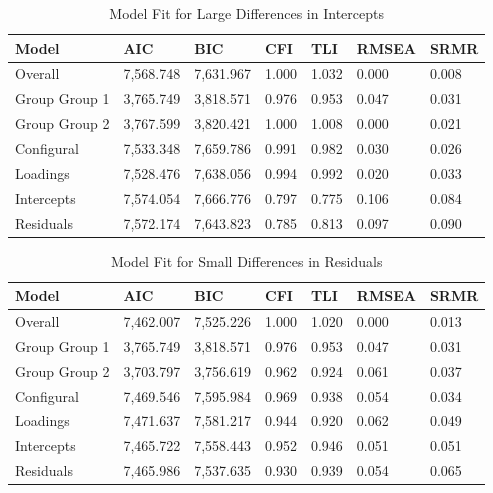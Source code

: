 \documentclass[
  man]{apa7}
\begin{document}
\begin{table}[tbp]

\begin{center}
\begin{threeparttable}

\caption{\label{tab:tab7}Model Fit for Large Differences in Intercepts}

\begin{tabular}{lllllll}
\toprule
Model & AIC & BIC & CFI & TLI & RMSEA & SRMR\\
\midrule
Overall & 7,568.748 & 7,631.967 & 1.000 & 1.032 & 0.000 & 0.008\\
Group Group 1 & 3,765.749 & 3,818.571 & 0.976 & 0.953 & 0.047 & 0.031\\
Group Group 2 & 3,767.599 & 3,820.421 & 1.000 & 1.008 & 0.000 & 0.021\\
Configural & 7,533.348 & 7,659.786 & 0.991 & 0.982 & 0.030 & 0.026\\
Loadings & 7,528.476 & 7,638.056 & 0.994 & 0.992 & 0.020 & 0.033\\
Intercepts & 7,574.054 & 7,666.776 & 0.797 & 0.775 & 0.106 & 0.084\\
Residuals & 7,572.174 & 7,643.823 & 0.785 & 0.813 & 0.097 & 0.090\\
\bottomrule
\end{tabular}

\end{threeparttable}
\end{center}

\end{table}

\begin{table}[tbp]

\begin{center}
\begin{threeparttable}

\caption{\label{tab:tab8}Model Fit for Small Differences in Residuals}

\begin{tabular}{lllllll}
\toprule
Model & AIC & BIC & CFI & TLI & RMSEA & SRMR\\
\midrule
Overall & 7,462.007 & 7,525.226 & 1.000 & 1.020 & 0.000 & 0.013\\
Group Group 1 & 3,765.749 & 3,818.571 & 0.976 & 0.953 & 0.047 & 0.031\\
Group Group 2 & 3,703.797 & 3,756.619 & 0.962 & 0.924 & 0.061 & 0.037\\
Configural & 7,469.546 & 7,595.984 & 0.969 & 0.938 & 0.054 & 0.034\\
Loadings & 7,471.637 & 7,581.217 & 0.944 & 0.920 & 0.062 & 0.049\\
Intercepts & 7,465.722 & 7,558.443 & 0.952 & 0.946 & 0.051 & 0.051\\
Residuals & 7,465.986 & 7,537.635 & 0.930 & 0.939 & 0.054 & 0.065\\
\bottomrule
\end{tabular}

\end{threeparttable}
\end{center}

\end{table}
\end{document}
